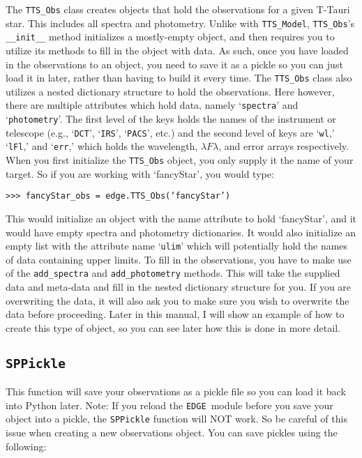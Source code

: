 \documentclass{article}
\newcommand{\edge}{\texttt{EDGE }}
\begin{document}
The \texttt{TTS\_Obs} class creates objects that hold the observations for a given T-Tauri star. This includes all spectra and photometry. Unlike with \texttt{TTS\_Model}, \texttt{TTS\_Obs}’s \texttt{\_\_init\_\_} method initializes a mostly-empty object, and then requires you to utilize its methods to fill in the object with data. As such, once you have loaded in the observations to an object, you need to save it as a pickle so you can just load it in later, rather than having to build it every time. 
The \texttt{TTS\_Obs} class also utilizes a nested dictionary structure to hold the observations. Here however, there are multiple attributes which hold data, namely `\texttt{spectra}' and `\texttt{photometry}'. The first level of the keys holds the names of the instrument or telescope (e.g., ‘\texttt{DCT}’, ‘\texttt{IRS}’, ‘\texttt{PACS}’, etc.) and the second level of keys are ‘\texttt{wl},’ ‘\texttt{lFl},’ and ‘\texttt{err},’ which holds the wavelength, $\lambda F\lambda$, and error arrays respectively.  
When you first initialize the \texttt{TTS\_Obs} object, you only supply it the name of your target. So if you are working with `fancyStar', you would type: 

\vspace{2mm}
\texttt{>>> fancyStar\_obs = edge.TTS\_Obs(‘fancyStar’)}
\vspace{2mm}

This would initialize an object with the name attribute to hold `fancyStar', and it would have empty spectra and photometry dictionaries. It would also initialize an empty list with the attribute name ‘\texttt{ulim}’ which will potentially hold the names of data containing upper limits. 
To fill in the observations, you have to make use of the \texttt{add\_spectra} and \texttt{add\_photometry} methods. This will take the supplied data and meta-data and fill in the nested dictionary structure for you. If you are overwriting the data, it will also ask you to make sure you wish to overwrite the data before proceeding. Later in this manual, I will show an example of how to create this type of object, so you can see later how this is done in more detail. 
 
\subsection{\texttt{SPPickle}}
 
This function will save your observations as a pickle file so you can load it back into Python later. Note: If you reload the \edge module before you save your object into a pickle, the \texttt{SPPickle} function will NOT work. So be careful of this issue when creating a new observations object. You can save pickles using the following:
\end{document}
